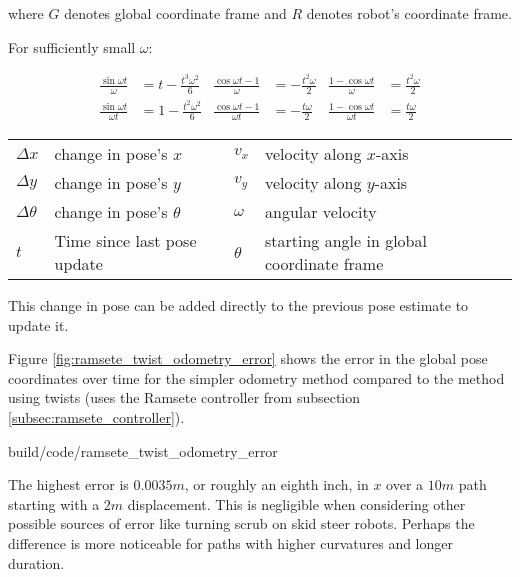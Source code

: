 \begin{theorem}
  where $G$ denotes global coordinate frame and $R$ denotes robot's coordinate
  frame.

  For sufficiently small $\omega$:

  \begin{align}
    \frac{\sin\omega t}{\omega} &= t - \frac{t^3 \omega^2}{6} &
    \frac{\cos\omega t - 1}{\omega} &= -\frac{t^2 \omega}{2} &
    \frac{1 - \cos\omega t}{\omega} &= \frac{t^2 \omega}{2} \\
    \frac{\sin\omega t}{\omega t} &= 1 - \frac{t^2 \omega^2}{6} &
    \frac{\cos\omega t - 1}{\omega t} &= -\frac{t \omega}{2} &
    \frac{1 - \cos\omega t}{\omega t} &= \frac{t \omega}{2}
  \end{align}

  \begin{figurekey}
    \begin{tabulary}{\linewidth}{LLLL}
      $\Delta x$ & change in pose's $x$ & $v_x$ & velocity along $x$-axis \\
      $\Delta y$ & change in pose's $y$ & $v_y$ & velocity along $y$-axis \\
      $\Delta \theta$ & change in pose's $\theta$ & $\omega$ & angular velocity
        \\
      $t$ & Time since last pose update & $\theta$ & starting angle in global
        coordinate frame
    \end{tabulary}
  \end{figurekey}

  This change in pose can be added directly to the previous pose estimate to
  update it.
\end{theorem}

Figure \ref{fig:ramsete_twist_odometry_error} shows the error in the global pose
coordinates over time for the simpler odometry method compared to the method
using twists (uses the Ramsete controller from subsection
\ref{subsec:ramsete_controller}).

\begin{svg}{build/code/ramsete_twist_odometry_error}
  \caption{Odometry error compared to method using twists}
  \label{fig:ramsete_twist_odometry_error}
\end{svg}

The highest error is $0.0035m$, or roughly an eighth inch, in $x$ over a $10m$
path starting with a $2m$ displacement. This is negligible when considering
other possible sources of error like turning scrub on skid steer robots. Perhaps
the difference is more noticeable for paths with higher curvatures and longer
duration.

